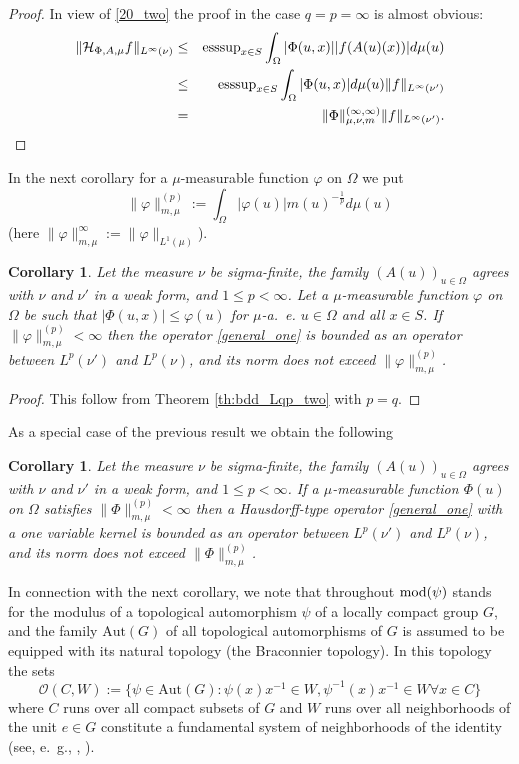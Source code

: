 \documentclass[12pt,reqno]{amsart}
\newtheorem{corollary}[theorem]{Corollary}
\begin{document}
\begin{proof}
In view of \eqref{20_two} the proof in the case $q=p= \infty$ is almost obvious:
\begin{eqnarray*}
\|\mathcal{H}_{\Phi, A,\mu}f\|_{L^\infty(\nu)}&\leq& {\rm esssup}_{x\in S}\int_\Omega |\Phi(u,x)||f(A(u)(x))|d\mu(u)\\
&\leq & {\rm esssup}_{x\in S}\int_\Omega |\Phi(u,x)|d\mu(u)\|f\|_{L^\infty(\nu')}\\
&=&\|\Phi\|_{\mu,\nu,m}^{(\infty,\infty)}\|f\|_{L^\infty(\nu')}.
\end{eqnarray*}
\end{proof}





In the next corollary for a $\mu$-measurable function $\varphi$ on $\Omega$ we put
$$ 
  \|\varphi\|_{m,\mu}^{(p)}:=\int_\Omega |\varphi(u)|m(u)^{-\frac 1p}d\mu(u)
$$
(here $ \|\varphi\|_{m,\mu}^{\infty}:=\|\varphi\|_{L^1(\mu)}$).

 
\begin{corollary}\label{cr:Lp} Let   the measure $\nu$ be   sigma-finite, the family $(A(u))_{u\in \Omega}$ agrees with $\nu$ and $\nu'$  in a weak form,  and $1\leq p< \infty$. Let  a $\mu$-measurable function $\varphi$ on $\Omega$ be such that $|\Phi(u,x)|\le \varphi(u)$ for $\mu$-a.~e. $u\in  \Omega$ and all $x\in S$. If $\|\varphi\|_{m,\mu}^{(p)}<\infty$
 then the operator \eqref{general_one}
 is bounded as an operator between $L^p(\nu')$ and  $L^p(\nu)$, and its norm does not exceed $ \|\varphi\|_{m,\mu}^{(p)}$.
\end{corollary}

\begin{proof} This follow from Theorem \ref{th:bdd_Lqp_two} with $p=q$.
 \end{proof}

As a special case of the  previous result we obtain the following

\begin{corollary}\label{cr:Lp2} Let  the measure $\nu$ be   sigma-finite, the family $(A(u))_{u\in \Omega}$ agrees with $\nu$  and  $\nu'$   in a weak form,  and $1\leq p< \infty$.  If a $\mu$-measurable function $\Phi(u)$ on $\Omega$ satisfies $\|\Phi\|_{m,\mu}^{(p)}<\infty$
 then a Hausdorff-type  operator \eqref{general_one}  with a one variable kernel  is bounded as an operator between $L^p(\nu')$ and  $L^p(\nu)$, and its norm does not exceed $ \|\Phi\|_{m,\mu}^{(p)}$.
\end{corollary}

In connection with the next corollary, we note that throughout 
 ${\rm mod}(\psi)$ stands for   the modulus of a topological automorphism $\psi$ of a locally compact group $G$, and
 the family $\mathrm{Aut}(G)$ of all topological automorphisms of  $G$ is assumed to be equipped with its natural topology (the Braconnier topology).
In this topology the sets 
$$
\mathcal{O}(C, W):=\{\psi\in \mathrm{Aut}(G): \psi(x)x^{-1}\in W,   \psi^{-1}(x)x^{-1}\in W \forall x\in C\} 
$$
where     $C$ runs over  all
compact subsets of $G$ and $W$ runs over all neighborhoods of the unit  $e\in G$
constitute a fundamental system of neighborhoods of the identity  (see, e.~g., \cite[(26.1)]{HiR}, \cite[Section III.3]{Hoch}).
\end{document}
